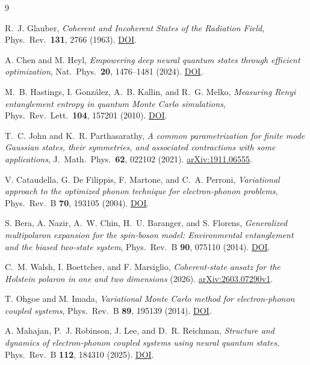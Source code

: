 \documentclass[../../main.tex]{subfiles}
\begin{document}
\begin{thebibliography}{9}

R.~J. Glauber, \emph{Coherent and Incoherent States of the Radiation Field},
Phys.\ Rev.\ \textbf{131}, 2766 (1963).
\href{https://doi.org/10.1103/PhysRev.131.2766}{DOI}.

A. Chen and M. Heyl, \emph{Empowering deep neural quantum states through
efficient optimization}, Nat.\ Phys.\ \textbf{20}, 1476--1481 (2024).
\href{https://doi.org/10.1038/s41567-024-02566-1}{DOI}.

M.~B. Hastings, I. Gonz\'alez, A.~B. Kallin, and R.~G. Melko,
\emph{Measuring Renyi entanglement entropy in quantum Monte Carlo
simulations}, Phys.\ Rev.\ Lett.\ \textbf{104}, 157201 (2010).
\href{https://doi.org/10.1103/PhysRevLett.104.157201}{DOI}.

T.~C. John and K.~R. Parthasarathy,
\emph{A common parametrization for finite mode Gaussian states, their
symmetries, and associated contractions with some applications},
J.\ Math.\ Phys.\ \textbf{62}, 022102 (2021).
\href{https://arxiv.org/abs/1911.06555}{arXiv:1911.06555}.

V. Cataudella, G. De Filippis, F. Martone, and C.~A. Perroni,
\emph{Variational approach to the optimized phonon technique for
electron-phonon problems}, Phys.\ Rev.\ B \textbf{70}, 193105 (2004).
\href{https://doi.org/10.1103/PhysRevB.70.193105}{DOI}.

S. Bera, A. Nazir, A.~W. Chin, H.~U. Baranger, and S. Florens,
\emph{Generalized multipolaron expansion for the spin-boson model:
Environmental entanglement and the biased two-state system},
Phys.\ Rev.\ B \textbf{90}, 075110 (2014).
\href{https://doi.org/10.1103/PhysRevB.90.075110}{DOI}.

C.~M. Walsh, I. Boettcher, and F. Marsiglio,
\emph{Coherent-state ansatz for the Holstein polaron in one and two
dimensions} (2026).
\href{https://arxiv.org/html/2603.07290v1}{arXiv:2603.07290v1}.

T. Ohgoe and M. Imada, \emph{Variational Monte Carlo method for
electron-phonon coupled systems}, Phys.\ Rev.\ B \textbf{89}, 195139 (2014).
\href{https://doi.org/10.1103/PhysRevB.89.195139}{DOI}.

A. Mahajan, P.~J. Robinson, J. Lee, and D.~R. Reichman,
\emph{Structure and dynamics of electron-phonon coupled systems using
neural quantum states}, Phys.\ Rev.\ B \textbf{112}, 184310 (2025).
\href{https://doi.org/10.1103/p8qz-p45d}{DOI}.

\end{thebibliography}
\end{document}
